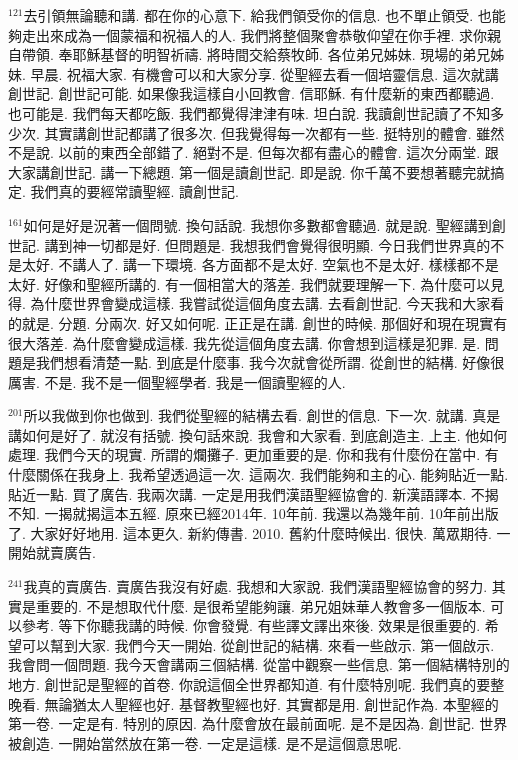 \documentclass{book}
\begin{document}
$^{121}$去引領無論聽和講.
都在你的心意下.
給我們領受你的信息.
也不單止領受.
也能夠走出來成為一個蒙福和祝福人的人.
我們將整個聚會恭敬仰望在你手裡.
求你親自帶領.
奉耶穌基督的明智祈禱.
將時間交給蔡牧師.
各位弟兄姊妹.
現場的弟兄姊妹.
早晨.
祝福大家.
有機會可以和大家分享.
從聖經去看一個培靈信息.
這次就講創世記.
創世記可能.
如果像我這樣自小回教會.
信耶穌.
有什麼新的東西都聽過.
也可能是.
我們每天都吃飯.
我們都覺得津津有味.
坦白說.
我讀創世記讀了不知多少次.
其實講創世記都講了很多次.
但我覺得每一次都有一些.
挺特別的體會.
雖然不是說.
以前的東西全部錯了.
絕對不是.
但每次都有盡心的體會.
這次分兩堂.
跟大家講創世記.
講一下總題.
第一個是讀創世記.
即是說.
你千萬不要想著聽完就搞定.
我們真的要經常讀聖經.
讀創世記.

$^{161}$如何是好是況著一個問號.
換句話說.
我想你多數都會聽過.
就是說.
聖經講到創世記.
講到神一切都是好.
但問題是.
我想我們會覺得很明顯.
今日我們世界真的不是太好.
不講人了.
講一下環境.
各方面都不是太好.
空氣也不是太好.
樣樣都不是太好.
好像和聖經所講的.
有一個相當大的落差.
我們就要理解一下.
為什麼可以見得.
為什麼世界會變成這樣.
我嘗試從這個角度去講.
去看創世記.
今天我和大家看的就是.
分題.
分兩次.
好又如何呢.
正正是在講.
創世的時候.
那個好和現在現實有很大落差.
為什麼會變成這樣.
我先從這個角度去講.
你會想到這樣是犯罪.
是.
問題是我們想看清楚一點.
到底是什麼事.
我今次就會從所謂.
從創世的結構.
好像很厲害.
不是.
我不是一個聖經學者.
我是一個讀聖經的人.

$^{201}$所以我做到你也做到.
我們從聖經的結構去看.
創世的信息.
下一次.
就講.
真是講如何是好了.
就沒有括號.
換句話來說.
我會和大家看.
到底創造主.
上主.
他如何處理.
我們今天的現實.
所謂的爛攤子.
更加重要的是.
你和我有什麼份在當中.
有什麼關係在我身上.
我希望透過這一次.
這兩次.
我們能夠和主的心.
能夠貼近一點.
貼近一點.
買了廣告.
我兩次講.
一定是用我們漢語聖經協會的.
新漢語譯本.
不揭不知.
一揭就揭這本五經.
原來已經2014年.
10年前.
我還以為幾年前.
10年前出版了.
大家好好地用.
這本更久.
新約傳書.
2010.
舊約什麼時候出.
很快.
萬眾期待.
一開始就賣廣告.

$^{241}$我真的賣廣告.
賣廣告我沒有好處.
我想和大家說.
我們漢語聖經協會的努力.
其實是重要的.
不是想取代什麼.
是很希望能夠讓.
弟兄姐妹華人教會多一個版本.
可以參考.
等下你聽我講的時候.
你會發覺.
有些譯文譯出來後.
效果是很重要的.
希望可以幫到大家.
我們今天一開始.
從創世記的結構.
來看一些啟示.
第一個啟示.
我會問一個問題.
我今天會講兩三個結構.
從當中觀察一些信息.
第一個結構特別的地方.
創世記是聖經的首卷.
你說這個全世界都知道.
有什麼特別呢.
我們真的要整晚看.
無論猶太人聖經也好.
基督教聖經也好.
其實都是用.
創世記作為.
本聖經的第一卷.
一定是有.
特別的原因.
為什麼會放在最前面呢.
是不是因為.
創世記.
世界被創造.
一開始當然放在第一卷.
一定是這樣.
是不是這個意思呢.
\end{document}
